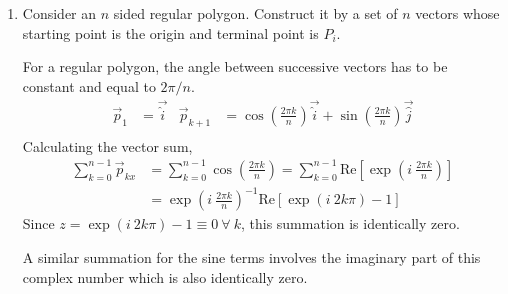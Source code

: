 \begin{enumerate}
\begin{enumerate}
              \item Consider an $ n $ sided regular polygon. Construct it by
                    a set of $ n $ vectors whose starting point is the origin and
                    terminal point is $ P_i $. \par
                    For a regular polygon, the angle between successive vectors has to be
                    constant and equal to $ 2\pi / n $.
                    \begin{align}
                        \vec{p}_1     & = \vec{\hat{i}} &
                        \vec{p}_{k+1} & =
                        \cos\left( \frac{2\pi k}{n} \right) \vec{\hat{i}}
                        + \sin\left( \frac{2\pi k}{n} \right) \vec{\hat{j}} \\
                    \end{align}
                    Calculating the vector sum,
                    \begin{align}
                        \sum_{k=0}^{n-1} \vec{p}_{kx} & = \sum_{k=0}^{n-1}
                        \cos\left( \frac{2\pi k}{n} \right)
                        = \sum_{k=0}^{n-1}
                        \text{Re}\left[ \exp\left( i\ \frac{2\pi k}{n} \right) \right] \\
                                                      & =
                        \exp\left( i\ \frac{2\pi k}{n} \right)^{-1}
                        \text{Re}[\exp(i\ 2k\pi) - 1]
                    \end{align}
                    Since $ z = \exp(i\ 2k \pi) - 1 \equiv 0 \ \forall\ k $, this
                    summation is identically zero. \par
                    A similar summation for the sine terms involves the imaginary part of
                    this complex number which is also identically zero.
          \end{enumerate}

\end{enumerate}